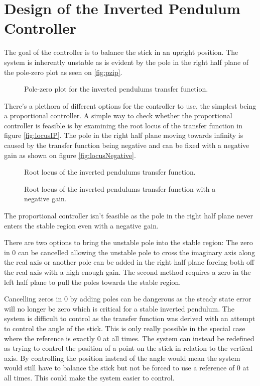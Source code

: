 \graphicspath{{figures/Design/IPController/}}
\chapter{Design of the Inverted Pendulum Controller}\label{sec:IPController}
The goal of the controller is to balance the stick in an upright position. 
The system is inherently unstable as is evident by the pole in the right half plane of the pole-zero plot as seen on \autoref{fig:pzip}.

\begin{figure}[htbp]
\centering
\missingfigure{}
\caption{Pole-zero plot for the inverted pendulums transfer function.}
\label{fig:pzip}
\end{figure}

There's a plethora of different options for the controller to use, the simplest being a proportional controller. A simple way to check whether the proportional controller is feasible is by examining the root locus of the transfer function in figure \autoref{fig:locusIP}. The pole in the right half plane moving towards infinity is caused by the transfer function being negative and can be fixed with a negative gain as shown on figure \autoref{fig:locusNegative}.

\begin{figure}[htbp]
\centering
\missingfigure{}
\caption{Root locus of the inverted pendulums transfer function.}
\label{fig:locusIP}
\end{figure}

\begin{figure}[htbp]
\centering
\missingfigure{}
\caption{Root locus of the inverted pendulums transfer function with a negative gain.}
\label{fig:locusNegative}
\end{figure}

The proportional controller isn't feasible as the pole in the right half plane never enters the stable region even with a negative gain.

There are two options to bring the unstable pole into the stable region: The zero in 0 can be cancelled allowing the unstable pole to cross the imaginary axis along the real axis or another pole can be added in the right half plane forcing both off the real axis with a high enough gain. The second method requires a zero in the left half plane to pull the poles towards the stable region.

Cancelling zeros in 0 by adding poles can be dangerous as the steady state error will no longer be zero which is critical for a stable inverted pendulum. The system is difficult to control as the transfer function was derived with an attempt to control the angle of the stick. This is only really possible in the special case where the reference is exactly 0 at all times. The system can instead be redefined as trying to control the position of a point on the stick in relation to the vertical axis. By controlling the position instead of the angle would mean the system would still have to balance the stick but not be forced to use a reference of 0 at all times. This could make the system easier to control.


